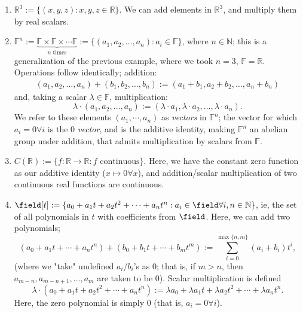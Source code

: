 \begin{example}
    \begin{enumerate}
        \item $\mathbb{R}^3 := \{(x, y, z) : x, y, z \in \mathbb{R}\}$. We can add elements in $\mathbb{R}^3$, and multiply them by real scalars.
        \item  $\mathbb{F}^n := \underbrace{\mathbb{F} \times \mathbb{F} \times \cdots \mathbb{F}}_{n \text{ times}} := \{(a_1, a_2, \dots, a_n) : a_i \in \mathbb{F}\}$, where $n \in \mathbb{N}$\footnotemark; this is a generalization of the previous example, where we took $n = 3$, $\mathbb{F} = \mathbb{R}$. Operations follow identically; addition:
        \begin{align*}
            (a_1, a_2, \dots, a_n) + (b_1, b_2, \dots, b_n) := (a_1 + b_1, a_2 + b_2, \dots, a_n + b_n)
        \end{align*}
        and, taking a scalar $\lambda \in \mathbb{F}$, multiplication:
        \[
            \lambda \cdot (a_1, a_2, \dots, a_n) := (\lambda \cdot a_1, \lambda \cdot a_2, \dots, \lambda \cdot a_n).
            \]
        We refer to these elements $(a_1, \cdots, a_n)$ as \emph{vectors} in $\mathbb{F}^n$; the vector for which $a_i = 0 \forall i$ is the \emph{$0$ vector}, and is the additive identity, making $\mathbb{F}^n$ an abelian group under addition, that admits multiplication by scalars from $\mathbb{F}$.
        \item $C(\mathbb{R}) := \{f : \mathbb{R} \to \mathbb{R} : f \text{ continuous}\}$. Here, we have the constant zero function as our additive identity ($x \mapsto 0 \forall x$), and addition/scalar multiplication of two continuous real functions are continuous.
        \item $\field[t] := \{a_0 + a_1 t + a_2 t^2 + \cdots + a_n t^n: a_i \in \field \forall i, n \in \mathbb{N}\}$, ie, the set of all polynomials in $t$ with coefficients from $\field$. Here, we can add two polynomials; \[
            (a_0 + a_1 t + \cdots + a_n t^n) + (b_0 + b_1 t + \cdots + b_m t^m) := \sum_{i=0}^{\max \{n, m\}}(a_i + b_i)t^i,
        \]
        (where we "take" undefined $a_i$/$b_i$'s as 0; that is, if $m > n$, then $a_{m - n}, a_{m - n + 1}, \dots, a_m$ are taken to be $0$). Scalar multiplication is defined \[
        \lambda \cdot (a_0 + a_1 t + a_2 t^2 + \cdots + a_n t^n) := \lambda a_0 + \lambda a_1 t + \lambda a_2 t^2 + \cdots + \lambda a_n t^n.
        \]
        Here, the zero polynomial is simply $0$ (that is, $a_i = 0 \forall i$).
    \end{enumerate}
\end{example}


